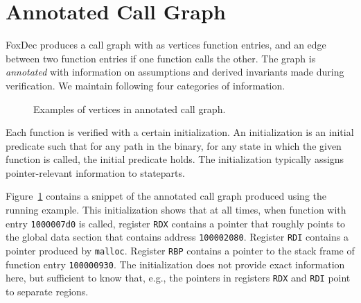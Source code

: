 \documentclass[12pt,a4paper]{article}
\newcounter{example}
\begin{document}
{	

\newpage

\section{Annotated Call Graph}\label{sec:callgraph}



FoxDec produces a call graph with as vertices function entries, and an edge between two function entries if one function calls the other.
The graph is \emph{annotated} with information on assumptions and derived invariants made during verification.
We maintain following four categories of information.

\begin{figure}[htb]
\centering
\caption{Examples of vertices in annotated call graph.}
\label{fig:callgraph1}
\end{figure}


\begin{description}[style=unboxed,leftmargin=0cm,noitemsep,nosep]
\item[INITIAL.] Each function is verified with a certain initialization.
An initialization is an initial predicate such that for any path in the binary, for any state in which the given function is called, the initial predicate holds.
The initialization typically assigns pointer-relevant information to stateparts.
\end{description}
\begin{example}[INITIAL]
Figure~\ref{fig:callgraph1} contains a snippet of the annotated call graph produced using the running example.
This initialization shows that at all times, when function with entry \texttt{1000007d0} is called, register \texttt{RDX} contains a pointer that roughly points to the global data section that contains address \texttt{100002080}. Register \texttt{RDI} contains a pointer produced by \texttt{malloc}. Register \texttt{RBP} contains a pointer to the stack frame of function entry \texttt{100000930}. The initialization does not provide exact information here, but sufficient to know that, e.g., the pointers in registers \texttt{RDX} and \texttt{RDI} point to separate regions.
\end{example}

}
\end{document}
